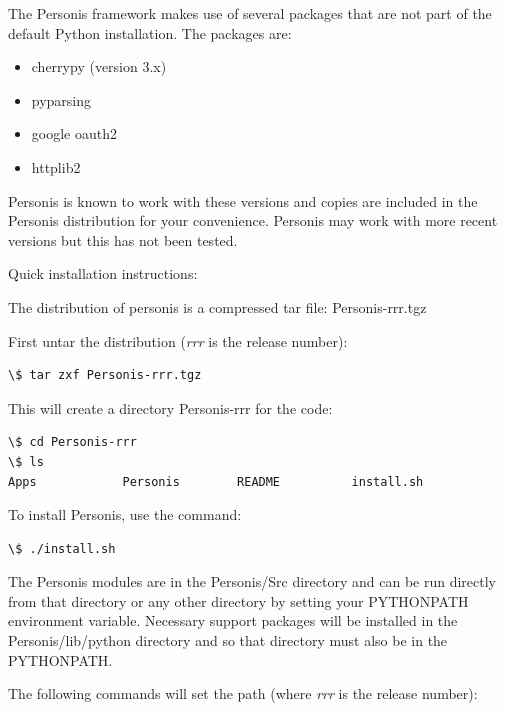\documentclass[letterpaper,10pt,english]{sphinxmanual}
\begin{document}
The Personis framework makes use of several packages that are not part
of the default Python installation.
The packages are:
\begin{itemize}
\item {} 
cherrypy (version 3.x)

\item {} 
pyparsing

\item {} 
google oauth2

\item {} 
httplib2

\end{itemize}

Personis is known to work with these versions and copies are included in
the Personis distribution for your convenience. Personis may work with
more recent versions but this has not been tested.

Quick installation instructions:

The distribution of personis is a compressed tar file: Personis-rrr.tgz

First untar the distribution (\emph{rrr} is the release number):

\begin{Verbatim}[commandchars=\\\{\}]
\$ tar zxf Personis-rrr.tgz
\end{Verbatim}

This will create a directory Personis-rrr for the code:

\begin{Verbatim}[commandchars=\\\{\}]
\$ cd Personis-rrr
\$ ls
Apps            Personis        README          install.sh
\end{Verbatim}

To install Personis, use the command:

\begin{Verbatim}[commandchars=\\\{\}]
\$ ./install.sh
\end{Verbatim}

The Personis modules are in the Personis/Src directory and can be run directly
from that directory or any other directory by setting your PYTHONPATH
environment variable.
Necessary support packages will be installed in the Personis/lib/python
directory and so that directory must also be in the PYTHONPATH.

The following commands will set the path (where \emph{rrr} is the release number):
\end{document}
